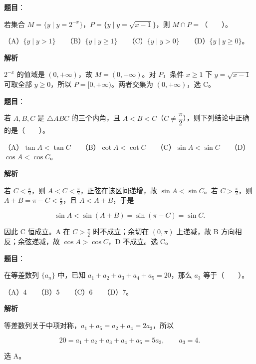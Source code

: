 \begin{answer}

\textbf{题目}：

若集合 $M=\{y\mid y=2^{-x}\}$，$P=\{y\mid y=\sqrt{x-1}\}$，则 $M\cap P=$\mbox{（　　）}。

（A）$\{y\mid y>1\}$　　（B）$\{y\mid y\ge1\}$　　（C）$\{y\mid y>0\}$　　（D）$\{y\mid y\ge0\}$。

\textbf{解析}

$2^{-x}$ 的值域是 $(0,+\infty)$，故 $M=(0,+\infty)$。对 $P$，条件 $x\geqslant1$ 下 $y=\sqrt{x-1}$ 可取全部 $y\geqslant0$，所以 $P=[0,+\infty)$。两者交集为 $(0,+\infty)$，选 C。


\end{answer}
\begin{answer}

\textbf{题目}：

若 $A,B,C$ 是 $\triangle ABC$ 的三个内角，且 $A<B<C$（$C\ne\dfrac\pi2$），则下列结论中正确的是\mbox{（　　）}。

（A）$\tan A<\tan C$　　（B）$\cot A<\cot C$　　（C）$\sin A<\sin C$　　（D）$\cos A<\cos C$。

\textbf{解析}

若 $C<\frac\pi2$，则 $A<C<\frac\pi2$，正弦在该区间递增，故 $\sin A<\sin C$。若 $C>\frac\pi2$，则 $A+B=\pi-C<\frac\pi2$，且 $A<A+B$，于是

\nopagebreak[4]
\[
\sin A<\sin(A+B)=\sin(\pi-C)=\sin C.
\]

因此 C 恒成立。A 在 $C>\frac\pi2$ 时不成立；余切在 $(0,\pi)$ 上递减，故 B 方向相反；余弦递减，故 $\cos A>\cos C$，D 不成立。选 C。


\end{answer}
\begin{answer}

\textbf{题目}：

在等差数列 $\{a_n\}$ 中，已知 $a_1+a_2+a_3+a_4+a_5=20$，那么 $a_3$ 等于\mbox{（　　）}。

（A）$4$　　（B）$5$　　（C）$6$　　（D）$7$。

\textbf{解析}

等差数列关于中项对称，$a_1+a_5=a_2+a_4=2a_3$，所以

\nopagebreak[4]
\[
20=a_1+a_2+a_3+a_4+a_5=5a_3,
\qquad a_3=4.
\]

选 A。


\end{answer}
